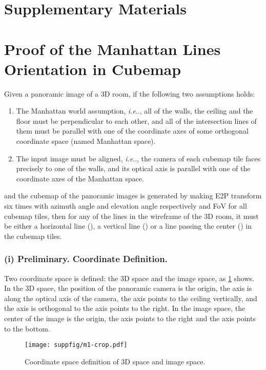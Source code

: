 \documentclass[runningheads]{llncs}
\makeatletter
\DeclareRobustCommand\onedot{\futurelet\@let@token\@onedot}
\def\@onedot{\ifx\@let@token.\else.\null\fi\xspace}
\def\ie{\emph{i.e}\onedot} \def\Ie{\emph{I.e}\onedot}
\makeatother
\begin{document}
\renewcommand\thesection{\Alph{section}}
\renewcommand\thesubsection{\thesection.\arabic{subsection}}
\newpage
\section*{\centering \Large Supplementary Materials}
\setcounter{section}{0}
\section{Proof of the Manhattan Lines Orientation in Cubemap}
\label{sec:proof}

Given a panoramic image of a 3D room, if the following two assumptions holds:
\normalem
\begin{enumerate}
    \item The Manhattan world assumption, \ie, all of the walls, the ceiling and the floor must be perpendicular to each other, and all of the intersection lines of them must be parallel with one of the coordinate axes of some orthogonal coordinate space (named Manhattan space).
\item The input image must be aligned, \ie, the camera of each cubemap tile faces precisely to one of the walls, and its optical axis is parallel with one of the coordinate axes of the Manhattan space.
\end{enumerate}
\ULforem
and the cubemap of the panoramic images is generated by making E2P transform six times with azimuth angle  and elevation angle  respectively and FoV for all cubemap tiles,
then for any of the lines in the wireframe of the 3D room, it must be either a horizontal line (), a vertical line () or a line passing the center () in the cubemap tiles.

\subsubsection{\textbf{(i) Preliminary. Coordinate Definition.}} 
Two coordinate space is defined: the 3D space and the image space, as \cref{fig:coord_def} shows. In the 3D space, the position of the panoramic camera is the origin, the  axis is along the optical axis of the camera, the  axis points to the ceiling vertically, and the  axis is orthogonal to the  axis points to the right. In the image space, the center of the image is the origin, the  axis points to the right and the  axis points to the bottom.

\begin{figure}[!h]
	\centering
	\texttt{[image: suppfig/m1-crop.pdf]}
	\caption{Coordinate space definition of 3D space and image space.}
\label{fig:coord_def} 
\end{figure}
\end{document}
